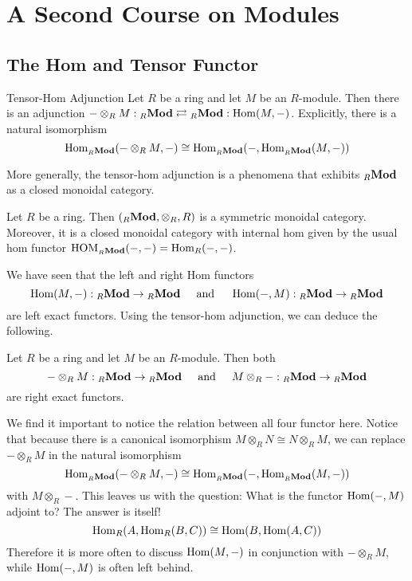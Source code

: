 \documentclass[a4paper]{article}
\begin{document}
\pagebreak
\section{A Second Course on Modules}
\subsection{The Hom and Tensor Functor}
\begin{thm}{Tensor-Hom Adjunction}{} Let $R$ be a ring and let $M$ be an $R$-module. Then there is an adjunction $-\otimes_RM:{_R\bold{Mod}}\rightleftarrows{_R\bold{Mod}}:\operatorname{Hom}(M,-)$. Explicitly, there is a natural isomorphism $$\operatorname{Hom}_{_R\bold{Mod}}(-\otimes_RM,-)\cong\operatorname{Hom}_{_R\bold{Mod}}(-,\operatorname{Hom}_{_R\bold{Mod}}(M,-))$$ 
\end{thm}

More generally, the tensor-hom adjunction is a phenomena that exhibits ${_R}\bold{Mod}$  as a closed monoidal category. 

\begin{prp}{}{} Let $R$ be a ring. Then $({_R}\bold{Mod},\otimes_R,R)$ is a symmetric monoidal category. Moreover, it is a closed monoidal category with internal hom given by the usual hom functor $\text{HOM}_{{_R}\bold{Mod}}(-,-)=\operatorname{Hom}_R(-,-)$. 
\end{prp}

We have seen that the left and right Hom functors $$\operatorname{Hom}(M,-):{_R\bold{Mod}}\to{_R\bold{Mod}}\;\;\;\;\text{ and }\;\;\;\;\operatorname{Hom}(-,M):{_R\bold{Mod}}\to{_R\bold{Mod}}$$ are left exact functors. Using the tensor-hom adjunction, we can deduce the following. 

\begin{prp}{}{} Let $R$ be a ring and let $M$ be an $R$-module. Then both $$-\otimes_R M:{_R\bold{Mod}}\to{_R\bold{Mod}}\;\;\;\;\text{ and }\;\;\;\;M\otimes_R-:{_R\bold{Mod}}\to{_R\bold{Mod}}$$ are right exact functors. 
\end{prp}

We find it important to notice the relation between all four functor here. Notice that because there is a canonical isomorphism $M\otimes_RN\cong N\otimes_RM$, we can replace $-\otimes_RM$ in the natural isomorphism $$\operatorname{Hom}_{_R\bold{Mod}}(-\otimes_RM,-)\cong\operatorname{Hom}_{_R\bold{Mod}}(-,\operatorname{Hom}_{_R\bold{Mod}}(M,-))$$ with $M\otimes_R-$. This leaves us with the question: What is the functor $\operatorname{Hom}(-,M)$ adjoint to? The answer is itself! $$\operatorname{Hom}_R(A,\operatorname{Hom}_R(B,C))\cong\operatorname{Hom}(B,\operatorname{Hom}(A,C))$$ Therefore it is more often to discuss $\operatorname{Hom}(M,-)$ in conjunction with $-\otimes_RM$, while $\operatorname{Hom}(-,M)$ is often left behind. \\~\\
\end{document}
